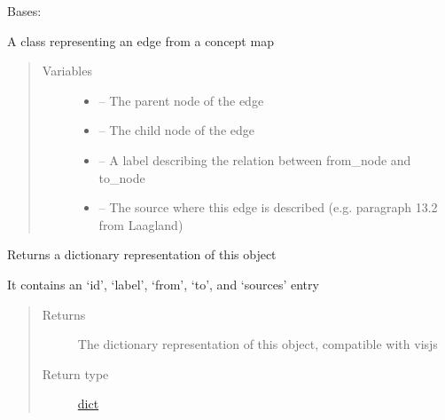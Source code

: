 \documentclass[letterpaper,10pt,english]{sphinxmanual}
\begin{document}
\begin{fulllineitems}
\label{\detokenize{edge:edge.Edge}}
Bases: 

A class representing an edge from a concept map
\begin{quote}\begin{description}
\item[{Variables}] \leavevmode\begin{itemize}
\item {} 
 -- The parent node of the edge

\item {} 
 -- The child node of the edge

\item {} 
 -- A label describing the relation between from\_node and to\_node

\item {} 
 -- The source where this edge is described (e.g. paragraph 13.2 from Laagland)

\end{itemize}

\end{description}\end{quote}

\begin{fulllineitems}
\label{\detokenize{edge:edge.Edge.to_dict}}
Returns a dictionary representation of this object

It contains an `id', `label', `from', `to', and `sources' entry
\begin{quote}\begin{description}
\item[{Returns}] \leavevmode
The dictionary representation of this object, compatible with visjs

\item[{Return type}] \leavevmode
\href{https://docs.python.org/2/library/stdtypes.html\#dict}{dict}

\end{description}\end{quote}

\end{fulllineitems}


\end{fulllineitems}
\end{document}
